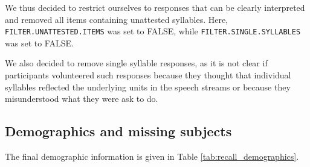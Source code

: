 \documentclass[]{article}
\begin{document}
We thus decided to restrict ourselves to responses that can be clearly
interpreted and removed all items containing unattested syllables. Here,
\texttt{FILTER.UNATTESTED.ITEMS} was set to FALSE, while
\texttt{FILTER.SINGLE.SYLLABLES} was set to FALSE.

We also decided to remove single syllable responses, as it is not clear
if participants volunteered such responses because they thought that
individual syllables reflected the underlying units in the speech
streams or because they misunderstood what they were ask to do.

\subsection{Demographics and missing
subjects}\label{demographics-and-missing-subjects}

The final demographic information is given in Table
\ref{tab:recall_demographics}.

\begin{table}

\caption{\label{tab:recall-final-demographics-print}\label{tab:recall_demographics}Demographics of the final sample. Note that the City participants completed both segmentation conditions.}
\centering
{}
\end{table}
\end{document}
